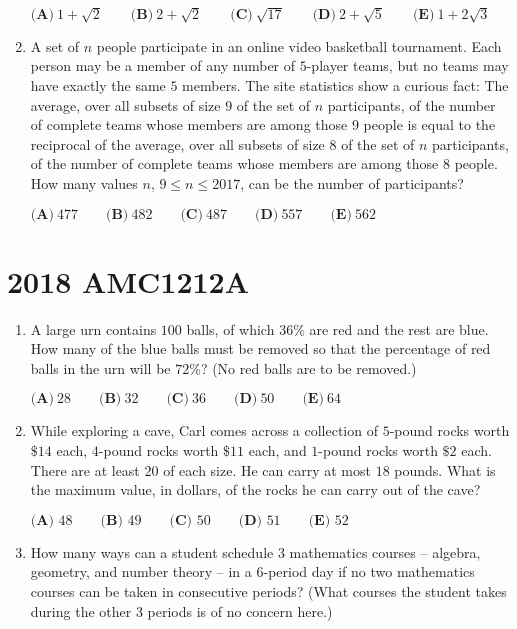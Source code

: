 \documentclass{article}
\begin{document}
\begin{enumerate}[label=\arabic*., itemsep=0.5em]
$\textbf{(A)}\ 1 + \sqrt{2} \qquad \textbf{(B)}\ 2 + \sqrt{2} \qquad \textbf{(C)}\ \sqrt{17} \qquad \textbf{(D)}\ 2 + \sqrt{5} \qquad\textbf{(E)}\ 1 + 2\sqrt{3}$\par \vspace{0.5em}\item A set of $n$ people participate in an online video basketball tournament. Each person may be a member of any number of $5$-player teams, but no teams may have exactly the same $5$ members. The site statistics show a curious fact: The average, over all subsets of size $9$ of the set of $n$ participants, of the number of complete teams whose members are among those 9 people is equal to the reciprocal of the average, over all subsets of size $8$ of the set of $n$ participants, of the number of complete teams whose members are among those $8$ people. How many values $n$, $9 \leq n \leq 2017$, can be the number of participants?

$\textbf{(A)}\ 477 \qquad \textbf{(B)}\ 482 \qquad \textbf{(C)}\ 487 \qquad \textbf{(D)}\ 557 \qquad\textbf{(E)}\ 562$\par \vspace{0.5em}\end{enumerate}\newpage\section*{2018 AMC1212A}\begin{enumerate}[label=\arabic*., itemsep=0.5em]\item A large urn contains $100$ balls, of which $36 \%$ are red and the rest are blue. How many of the blue balls must be removed so that the percentage of red balls in the urn will be $72 \%$? (No red balls are to be removed.)

$ \textbf{(A)}\ 28 \qquad\textbf{(B)}\  32 \qquad\textbf{(C)}\  36 \qquad\textbf{(D)}\ 
 50 \qquad\textbf{(E)}\ 64 $\par \vspace{0.5em}\item While exploring a cave, Carl comes across a collection of $5$-pound rocks worth $\$14$ each, $4$-pound rocks worth $\$11$ each, and $1$-pound rocks worth $\$2$ each. There are at least $20$ of each size. He can carry at most $18$ pounds. What is the maximum value, in dollars, of the rocks he can carry out of the cave?

$\textbf{(A) } 48 \qquad \textbf{(B) } 49 \qquad \textbf{(C) } 50 \qquad \textbf{(D) } 51 \qquad \textbf{(E) } 52 $\par \vspace{0.5em}\item How many ways can a student schedule $3$ mathematics courses -- algebra, geometry, and number theory -- in a $6$-period day if no two mathematics courses can be taken in consecutive periods? (What courses the student takes during the other $3$ periods is of no concern here.)


\end{enumerate}
\end{document}
